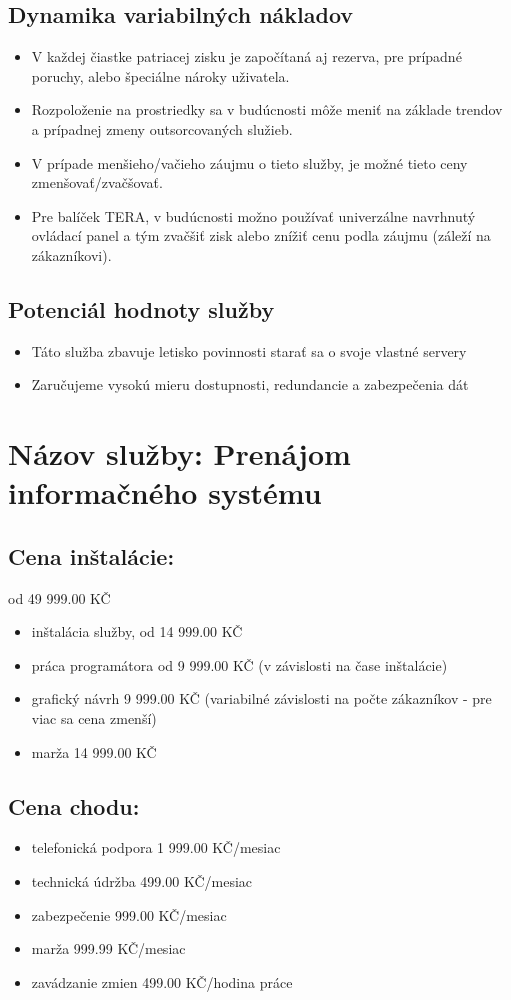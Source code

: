 \documentclass[a4paper, 11pt]{article}
\begin{document}
\subsection*{Dynamika variabilných nákladov}
\begin{itemize}
\item V každej čiastke patriacej zisku je započítaná aj rezerva, pre prípadné poruchy, alebo špeciálne nároky uživatela.
\item Rozpoloženie na prostriedky sa v budúcnosti môže meniť na základe trendov a prípadnej zmeny outsorcovaných služieb.
\item V prípade menšieho/vačieho záujmu o tieto služby, je možné tieto ceny zmenšovať/zvačšovať.
\item Pre balíček TERA, v budúcnosti možno používať univerzálne navrhnutý ovládací panel a tým zvačšiť zisk alebo znížiť cenu podla záujmu (záleží na zákazníkovi).
\end{itemize}

\subsection*{Potenciál hodnoty služby}
\begin{itemize}
\item Táto služba zbavuje letisko povinnosti starať sa o svoje vlastné servery
\item Zaručujeme vysokú mieru dostupnosti, redundancie a zabezpečenia dát
\end{itemize}

\clearpage
\section*{Názov služby: Prenájom informačného systému}
\subsection*{Cena inštalácie:} od 49 999.00 KČ
\begin{itemize}
\item inštalácia služby, od 14 999.00 KČ
\item práca programátora od 9 999.00 KČ (v závislosti na čase inštalácie)
\item grafický návrh 9 999.00 KČ (variabilné závislosti na počte zákazníkov - pre viac sa cena zmenší)
\item marža 14 999.00 KČ
\end{itemize}
\subsection*{Cena chodu:}
\begin{itemize}
\item telefonická podpora 1 999.00 KČ/mesiac
\item technická údržba 499.00 KČ/mesiac
\item zabezpečenie 999.00 KČ/mesiac
\item marža 999.99 KČ/mesiac
\item zavádzanie zmien 499.00 KČ/hodina práce
\end{itemize}
\end{document}
